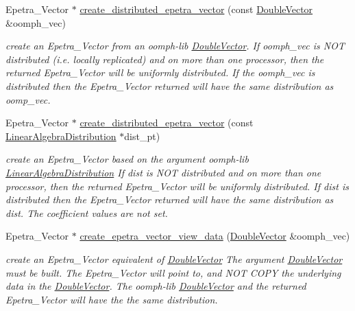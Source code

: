 \begin{DoxyCompactItemize}
\item 
Epetra\+\_\+\+Vector $\ast$ \hyperlink{namespaceoomph_1_1TrilinosEpetraHelpers_a914dd010ddb4896a7af801945a2db912}{create\+\_\+distributed\+\_\+epetra\+\_\+vector} (const \hyperlink{classoomph_1_1DoubleVector}{Double\+Vector} \&oomph\+\_\+vec)
\begin{DoxyCompactList}\small\item\em create an Epetra\+\_\+\+Vector from an oomph-\/lib \hyperlink{classoomph_1_1DoubleVector}{Double\+Vector}. If oomph\+\_\+vec is N\+OT distributed (i.\+e. locally replicated) and on more than one processor, then the returned Epetra\+\_\+\+Vector will be uniformly distributed. If the oomph\+\_\+vec is distributed then the Epetra\+\_\+\+Vector returned will have the same distribution as oomp\+\_\+vec. \end{DoxyCompactList}\item 
Epetra\+\_\+\+Vector $\ast$ \hyperlink{namespaceoomph_1_1TrilinosEpetraHelpers_abdba45d59fca1a4509df5a1c6b44d0bc}{create\+\_\+distributed\+\_\+epetra\+\_\+vector} (const \hyperlink{classoomph_1_1LinearAlgebraDistribution}{Linear\+Algebra\+Distribution} $\ast$dist\+\_\+pt)
\begin{DoxyCompactList}\small\item\em create an Epetra\+\_\+\+Vector based on the argument oomph-\/lib \hyperlink{classoomph_1_1LinearAlgebraDistribution}{Linear\+Algebra\+Distribution} If dist is N\+OT distributed and on more than one processor, then the returned Epetra\+\_\+\+Vector will be uniformly distributed. If dist is distributed then the Epetra\+\_\+\+Vector returned will have the same distribution as dist. The coefficient values are not set. \end{DoxyCompactList}\item 
Epetra\+\_\+\+Vector $\ast$ \hyperlink{namespaceoomph_1_1TrilinosEpetraHelpers_acc7e0619f591ab3b4dc04802444dc92b}{create\+\_\+epetra\+\_\+vector\+\_\+view\+\_\+data} (\hyperlink{classoomph_1_1DoubleVector}{Double\+Vector} \&oomph\+\_\+vec)
\begin{DoxyCompactList}\small\item\em create an Epetra\+\_\+\+Vector equivalent of \hyperlink{classoomph_1_1DoubleVector}{Double\+Vector} The argument \hyperlink{classoomph_1_1DoubleVector}{Double\+Vector} must be built. The Epetra\+\_\+\+Vector will point to, and N\+OT C\+O\+PY the underlying data in the \hyperlink{classoomph_1_1DoubleVector}{Double\+Vector}. The oomph-\/lib \hyperlink{classoomph_1_1DoubleVector}{Double\+Vector} and the returned Epetra\+\_\+\+Vector will have the the same distribution. \end{DoxyCompactList}\item 

\end{DoxyCompactItemize}
